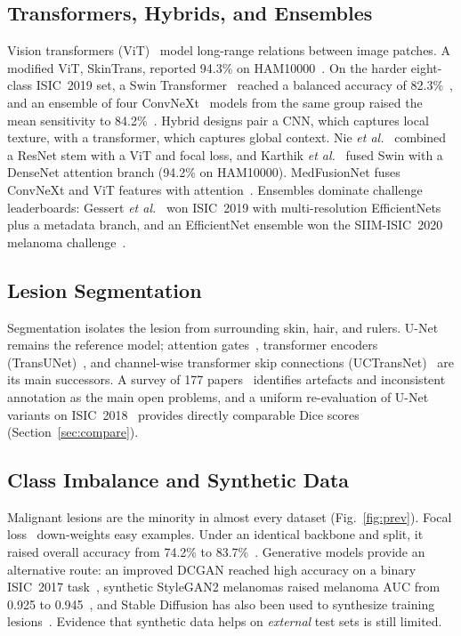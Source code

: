 \subsection{Transformers, Hybrids, and Ensembles}
Vision transformers (ViT)~\cite{dosovitskiy2021vit} model long-range
relations between image patches. A modified ViT, SkinTrans, reported
94.3\% on HAM10000~\cite{xin2022skintrans}. On the harder eight-class
ISIC~2019 set, a Swin Transformer~\cite{liu2021swin} reached a
balanced accuracy of 82.3\%~\cite{ayas2023swin}, and an ensemble of
four ConvNeXt~\cite{liu2022convnext} models from the same group
raised the mean sensitivity to 84.2\%~\cite{baykal2024convnext}. Hybrid
designs pair a CNN, which captures local texture, with a transformer,
which captures global context. Nie \emph{et al.}~\cite{nie2023hybrid}
combined a ResNet stem with a ViT and focal loss, and Karthik
\emph{et al.}~\cite{karthik2024} fused Swin with a DenseNet attention
branch (94.2\% on HAM10000). MedFusionNet fuses ConvNeXt and ViT
features with attention~\cite{naeem2025}. Ensembles dominate challenge
leaderboards: Gessert \emph{et al.}~\cite{gessert2020} won ISIC~2019
with multi-resolution EfficientNets plus a metadata branch, and an
EfficientNet ensemble won the SIIM-ISIC~2020 melanoma
challenge~\cite{ha2020siim}.

\subsection{Lesion Segmentation}
Segmentation isolates the lesion from surrounding skin, hair, and
rulers. U-Net~\cite{ronneberger2015unet} remains the reference model;
attention gates~\cite{oktay2018attunet}, transformer encoders
(TransUNet)~\cite{chen2021transunet}, and channel-wise transformer skip
connections (UCTransNet)~\cite{wang2022uctransnet} are its main
successors. A survey of 177 papers~\cite{mirikharaji2023} identifies
artefacts and inconsistent annotation as the main open problems, and a
uniform re-evaluation of U-Net variants on ISIC~2018~\cite{azad2024unet}
provides directly comparable Dice scores (Section~\ref{sec:compare}).

\subsection{Class Imbalance and Synthetic Data}
Malignant lesions are the minority in almost every dataset
(Fig.~\ref{fig:prev}). Focal loss~\cite{lin2017focal} down-weights
easy examples. Under an identical backbone and split, it raised overall
accuracy from 74.2\% to 83.7\%~\cite{nie2023hybrid}. Generative
models provide an alternative route: an improved DCGAN reached high
accuracy on a binary ISIC~2017 task~\cite{behara2023}, synthetic
StyleGAN2 melanomas raised melanoma AUC from 0.925 to
0.945~\cite{lin2026}, and Stable Diffusion has also been used to
synthesize training lesions~\cite{farooq2024}. Evidence that synthetic
data helps on \emph{external} test sets is still limited.

